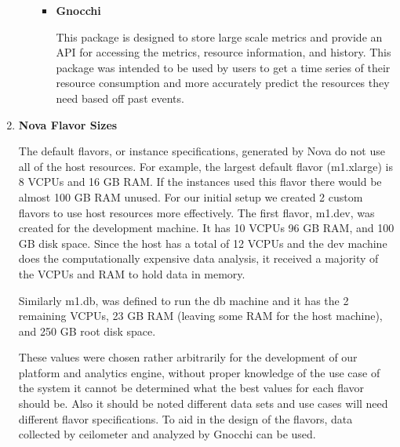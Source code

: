 \begin{enumerate}
\begin{itemize}
\begin{itemize}
          \item \textbf{Gnocchi}

            This package is designed to store large scale metrics and
            provide an API for accessing the metrics, resource
            information, and history. This package was intended to be 
            used by users to get a time series of their resource 
            consumption and more accurately predict the resources they
            need based off past events.

        \end{itemize}
    \end{itemize}

  \item \textbf{Nova Flavor Sizes}

    The default flavors, or instance specifications, generated by Nova
    do not use all of the host resources. For example, the largest
    default flavor (m1.xlarge) is 8 VCPUs and 16 GB RAM. If the
    instances used this flavor there would be almost 100 GB RAM unused.
    For our initial setup we created 2 custom flavors to use host
    resources more effectively. The first flavor, m1.dev, was created 
    for the development machine. It has 10 VCPUs 96 GB RAM, and 100 GB
    disk space. Since the host has a total of 12 VCPUs and the dev 
    machine does the computationally expensive data analysis, it
    received a majority of the VCPUs and RAM to hold data in memory.

    Similarly m1.db, was defined to run the db machine and it has the 2
    remaining VCPUs, 23 GB RAM (leaving some RAM for the host machine),
    and 250 GB root disk space.

    These values were chosen rather arbitrarily for the development of
    our platform and analytics engine, without proper knowledge of the 
    use case of the system it cannot be determined what the best values
    for each flavor should be. Also it should be noted different data
    sets and use cases will need different flavor specifications. To aid
    in the design of the flavors, data collected by ceilometer and
    analyzed by Gnocchi can be used.

\end{enumerate}
